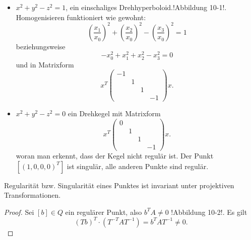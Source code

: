 \documentclass[11pt]{article}
\begin{document}
\begin{example}
    \begin{itemize}
        \item $x^2+y^2-z^2 = 1$, ein einschaliges Drehhyperboloid.!Abbildung 10-1!. Homogenisieren funktioniert wie gewohnt:
            \begin{equation*}
                \left(\frac{x_1}{x_0}\right)^2 + \left(\frac{x_2}{x_0}\right)^2 - \left(\frac{x_3}{x_0}\right)^2 = 1
            \end{equation*}
            beziehungsweise 
            \begin{equation*}
                -x_0^2 + x_1^2 + x_2^2-x_3^2 = 0
            \end{equation*}
            und in Matrixform 
            \begin{equation*}
                x^T\left(
                \begin{array}{cccc}
                     -1  \\
                     &1\\
                     &&1\\
                     &&&-1
                \end{array}
                \right)x.
            \end{equation*}
        \item $x^2+y^2-z^2 = 0$ ein Drehkegel mit Matrixform 
            \begin{equation*}
                x^T\left(
                \begin{array}{cccc}
                     0  \\
                     &1\\
                     &&1\\
                     &&&-1
                \end{array}\right)x.
            \end{equation*} woran man erkennt, dass der Kegel nicht regulär ist. Der Punkt $[(1,0,0,0)^T]$ ist singulär, alle anderen Punkte sind regulär.
    \end{itemize}
\end{example}

\begin{theorem}
    Regularität bzw. Singularität eines Punktes ist invariant unter projektiven Transformationen.
\end{theorem}

\begin{proof}
    Sei $[b]\in Q$ ein regulärer Punkt, also $b^TA\neq 0$ !Abbildung 10-2!. Es gilt 
    \begin{equation*}
        (Tb)^T\cdot(T^{-T}AT^{-1}) = b^TAT^{-1}\neq 0.
    \end{equation*}
\end{proof}
\end{document}
